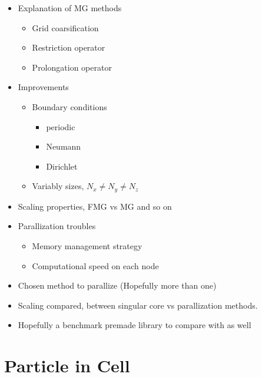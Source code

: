 	\begin{itemize}
		\item Explanation of MG methods
			\begin{itemize}
				\item Grid coarsification
				\item Restriction operator
				\item Prolongation operator
			\end{itemize}
		\item Improvements
			\begin{itemize}
				\item Boundary conditions
					\begin{itemize}
						\item periodic
						\item Neumann
						\item Dirichlet
					\end{itemize}
				\item Variably sizes, \(N_x \neq N_y \neq N_z\)
			\end{itemize}
		\item Scaling properties, FMG vs MG and so on
		\item Parallization troubles
			\begin{itemize}
				\item Memory management strategy
				\item Computational speed on each node
			\end{itemize}
		\item Chosen method to parallize (Hopefully more than one)
		\item Scaling compared, between singular core vs parallization methods.
		\item Hopefully a benchmark premade library to compare with as well
	\end{itemize}

	\section{Particle in Cell}


